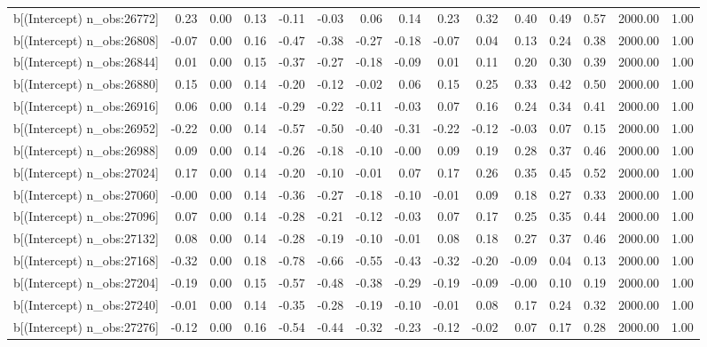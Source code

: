 \begin{table}[ht]
\begin{tabular}{rrrrrrrrrrrrrrr}
  b[(Intercept) n\_obs:26772] & 0.23 & 0.00 & 0.13 & -0.11 & -0.03 & 0.06 & 0.14 & 0.23 & 0.32 & 0.40 & 0.49 & 0.57 & 2000.00 & 1.00 \\ 
  b[(Intercept) n\_obs:26808] & -0.07 & 0.00 & 0.16 & -0.47 & -0.38 & -0.27 & -0.18 & -0.07 & 0.04 & 0.13 & 0.24 & 0.38 & 2000.00 & 1.00 \\ 
  b[(Intercept) n\_obs:26844] & 0.01 & 0.00 & 0.15 & -0.37 & -0.27 & -0.18 & -0.09 & 0.01 & 0.11 & 0.20 & 0.30 & 0.39 & 2000.00 & 1.00 \\ 
  b[(Intercept) n\_obs:26880] & 0.15 & 0.00 & 0.14 & -0.20 & -0.12 & -0.02 & 0.06 & 0.15 & 0.25 & 0.33 & 0.42 & 0.50 & 2000.00 & 1.00 \\ 
  b[(Intercept) n\_obs:26916] & 0.06 & 0.00 & 0.14 & -0.29 & -0.22 & -0.11 & -0.03 & 0.07 & 0.16 & 0.24 & 0.34 & 0.41 & 2000.00 & 1.00 \\ 
  b[(Intercept) n\_obs:26952] & -0.22 & 0.00 & 0.14 & -0.57 & -0.50 & -0.40 & -0.31 & -0.22 & -0.12 & -0.03 & 0.07 & 0.15 & 2000.00 & 1.00 \\ 
  b[(Intercept) n\_obs:26988] & 0.09 & 0.00 & 0.14 & -0.26 & -0.18 & -0.10 & -0.00 & 0.09 & 0.19 & 0.28 & 0.37 & 0.46 & 2000.00 & 1.00 \\ 
  b[(Intercept) n\_obs:27024] & 0.17 & 0.00 & 0.14 & -0.20 & -0.10 & -0.01 & 0.07 & 0.17 & 0.26 & 0.35 & 0.45 & 0.52 & 2000.00 & 1.00 \\ 
  b[(Intercept) n\_obs:27060] & -0.00 & 0.00 & 0.14 & -0.36 & -0.27 & -0.18 & -0.10 & -0.01 & 0.09 & 0.18 & 0.27 & 0.33 & 2000.00 & 1.00 \\ 
  b[(Intercept) n\_obs:27096] & 0.07 & 0.00 & 0.14 & -0.28 & -0.21 & -0.12 & -0.03 & 0.07 & 0.17 & 0.25 & 0.35 & 0.44 & 2000.00 & 1.00 \\ 
  b[(Intercept) n\_obs:27132] & 0.08 & 0.00 & 0.14 & -0.28 & -0.19 & -0.10 & -0.01 & 0.08 & 0.18 & 0.27 & 0.37 & 0.46 & 2000.00 & 1.00 \\ 
  b[(Intercept) n\_obs:27168] & -0.32 & 0.00 & 0.18 & -0.78 & -0.66 & -0.55 & -0.43 & -0.32 & -0.20 & -0.09 & 0.04 & 0.13 & 2000.00 & 1.00 \\ 
  b[(Intercept) n\_obs:27204] & -0.19 & 0.00 & 0.15 & -0.57 & -0.48 & -0.38 & -0.29 & -0.19 & -0.09 & -0.00 & 0.10 & 0.19 & 2000.00 & 1.00 \\ 
  b[(Intercept) n\_obs:27240] & -0.01 & 0.00 & 0.14 & -0.35 & -0.28 & -0.19 & -0.10 & -0.01 & 0.08 & 0.17 & 0.24 & 0.32 & 2000.00 & 1.00 \\ 
  b[(Intercept) n\_obs:27276] & -0.12 & 0.00 & 0.16 & -0.54 & -0.44 & -0.32 & -0.23 & -0.12 & -0.02 & 0.07 & 0.17 & 0.28 & 2000.00 & 1.00 \\ 

\end{tabular}
\end{table}
